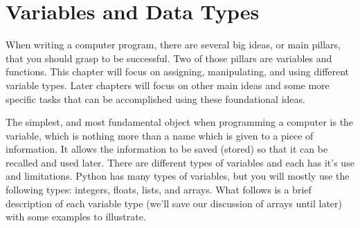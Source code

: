 \chapter{Variables and Data Types}
\label{chap:variablesDataTypes}

When writing a computer program, there are several big ideas, or main
pillars, that you should grasp to be successful.  Two of those pillars
are variables and functions. This chapter will focus on assigning,
manipulating, and using different variable types.  Later chapters will
focus on other main ideas and some more specific tasks that can be
accomplished using these foundational ideas.

The simplest, and most fundamental object when programming a computer
is the variable, which is nothing more than a name which is given to a
piece of information. It allows the information to be saved (stored)
so that it can be recalled and used later.   There
are different types of variables and each has it's use and
limitations.  Python has many types of variables, but you will mostly
use the following types: integers, floats, lists, and arrays.  What
follows is a brief description of each variable type (we'll save our
discussion of arrays until later) with some examples to illustrate.

